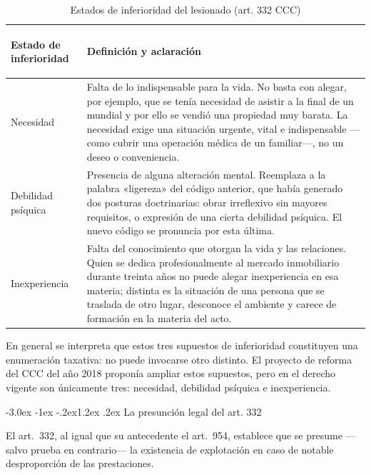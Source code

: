 \documentclass[12pt,oneside]{book}
\makeatletter
\renewcommand\section{\@startsection{section}{1}{\z@}%
  {-3.0ex \@plus -1ex \@minus -.2ex}{1.2ex \@plus .2ex}%
  {\normalfont\large\bfseries\color{acento}}}
\makeatother
\begin{document}
\begin{table}[H]
\centering
\caption{Estados de inferioridad del lesionado (art. 332 CCC)}
\begin{tabularx}{\textwidth}{>{\bfseries\raggedright\arraybackslash}p{} X}
\toprule
\textbf{Estado de inferioridad} & \textbf{Definición y aclaración} \\
\midrule
Necesidad & Falta de lo indispensable para la vida. No basta con alegar, por ejemplo, que se tenía necesidad de asistir a la final de un mundial y por ello se vendió una propiedad muy barata. La necesidad exige una situación urgente, vital e indispensable ---como cubrir una operación médica de un familiar---, no un deseo o conveniencia. \\
Debilidad psíquica & Presencia de alguna alteración mental. Reemplaza a la palabra «ligereza» del código anterior, que había generado dos posturas doctrinarias: obrar irreflexivo sin mayores requisitos, o expresión de una cierta debilidad psíquica. El nuevo código se pronuncia por esta última. \\
Inexperiencia & Falta del conocimiento que otorgan la vida y las relaciones. Quien se dedica profesionalmente al mercado inmobiliario durante treinta años no puede alegar inexperiencia en esa materia; distinta es la situación de una persona que se traslada de otro lugar, desconoce el ambiente y carece de formación en la materia del acto. \\
\bottomrule
\end{tabularx}
\end{table}

\begin{importante}
En general se interpreta que estos tres supuestos de inferioridad constituyen una enumeración taxativa: no puede invocarse otro distinto. El proyecto de reforma del CCC del año 2018 proponía ampliar estos supuestos, pero en el derecho vigente son únicamente tres: necesidad, debilidad psíquica e inexperiencia.
\end{importante}

\section{La presunción legal del art. 332}

El art.\ 332, al igual que su antecedente el art.\ 954, establece que se presume ---salvo prueba en contrario--- la existencia de explotación en caso de notable desproporción de las prestaciones.
\end{document}
